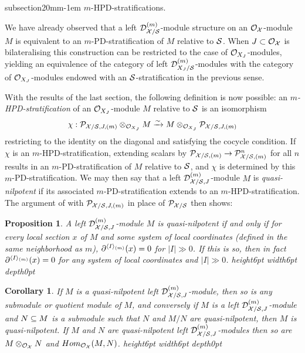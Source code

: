 \documentclass{article}
\makeatletter
\theoremstyle{change}
\newtheorem{prop}[subsubsection]{Proposition}
\newtheorem{cor}[subsubsection]{Corollary}
\renewcommand{\subsection}{\@startsection%
{subsection}{2}{0mm}{\baselineskip}{-1em}%
{\normalfont\normalsize\bfseries}}
\numberwithin{equation}{subsubsection}
\newcommand{\demobox}{\vrule height6pt width6pt depth0pt}
\newcommand{\nodemo}{\unskip\nobreak\hfil\qquad
\demobox\parfillskip=0pt\par}
\makeatother
\begin{document}
\subsection{$m$-HPD-stratifications.}
\label{sec:m-HPD-stratifications}

We have already observed that a left ${{\cal D}}^{({m})}_{{\cal X}/{\cal S}}$-module
structure on an ${\cal O}_{\cal X}$-module $M$ is equivalent to an
$m$-PD-stratification of $M$ relative to ${\cal S}$. When $J\subset{\cal O}_{\cal X}$
is bilateralising this construction can be restricted to the case of
${\cal O}_{X_J}$-modules, yielding an equivalence of the category of left
${{\cal D}}^{({m})}_{X_J/{\cal S}}$-modules with the category of
${\cal O}_{X_J}$-modules endowed with an ${\cal S}$-stratification in the
previous sense. 

With the results of the last section, the following definition is now
possible: an \textit{$m$-HPD-stratification} of an ${\cal O}_{X_J}$-module
$M$ relative to ${\cal S}$ is an isomorphism
\begin{equation}
  \label{eq:m-HPD-stratification}
  \chi:{\cal P}_{{\cal X}/{\cal S},J,(m)}\otimes_{{\cal O}_{X_J}}M\xrightarrow{\sim} M\otimes_{{\cal O}_{X_J}}{\cal P}_{{\cal X}/{\cal S},J,(m)}
\end{equation}
restricting to the identity on the diagonal and satisfying the cocycle
condition. If $\chi$ is an $m$-HPD-stratification, extending scalars
by ${\cal P}_{{\cal X}/{\cal S},(m)}\to{\cal P}^n_{{\cal X}/{\cal S},(m)}$ for all $n$ results in an
$m$-PD-stratification of $M$ relative to ${\cal S}$, and $\chi$ is
determined by this $m$-PD-stratification. We may then say that a left
${{\cal D}}^{({m})}_{{\cal X}/{\cal S},J}$-module $M$ is \textit{quasi-nilpotent} if
its associated $m$-PD-stratification extends to an
$m$-HPD-stratification. The argument of
\cite[Prop. 2.3.7]{berthelot:1996} with ${\cal P}_{{\cal X}/{\cal S},J,(m)}$ in place
of ${\cal P}_{{\cal X}/{\cal S}}$ then shows:

\begin{prop}\label{prop:nilpotence-criterion}
  A left ${{\cal D}}^{({m})}_{{\cal X}/{\cal S},J}$-module $M$ is quasi-nilpotent if and
  only if for every local section $x$ of $M$ and some system of local
  coordinates (defined in the same neighborhood as $m$),
  ${{\partial}}^{\langle{I}\rangle_{(m)}}(x)=0$ for $|I|\gg0$. If this is so, then in fact
  ${{\partial}}^{\langle{I}\rangle_{(m)}}(x)=0$ for any system of local coordinates and
  $|I|\gg0$. \nodemo
\end{prop}

\begin{cor}\label{cor:nilpotence-criterion}
  If $M$ is a quasi-nilpotent left ${{\cal D}}^{({m})}_{{\cal X}/{\cal S},J}$-module,
  then so is any submodule or quotient module of $M$, and conversely
  if $M$ is a left ${{\cal D}}^{({m})}_{{\cal X}/{\cal S},J}$-module and $N\subseteq M$ is
  a submodule such that $N$ and $M/N$ are quasi-nilpotent, then $M$ is
  quasi-nilpotent. If $M$ and $N$ are quasi-nilpotent left
  ${{\cal D}}^{({m})}_{{\cal X}/{\cal S},J}$-modules then so are $M\otimes_{{\cal O}_{\cal X}}N$ and
  $Hom_{{\cal O}_{\cal X}}(M,N)$.\nodemo
\end{cor}
\end{document}
